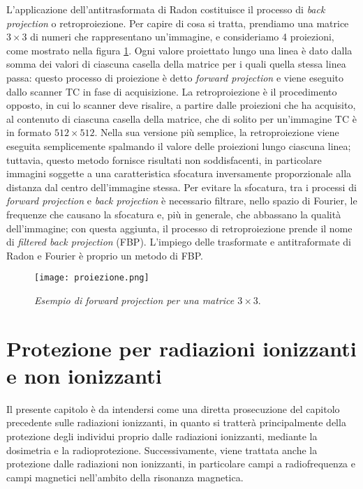 \documentclass{report}
\newcommand{\figref}[1]{figura \ref{#1}}
\numberwithin{equation}{section}
\numberwithin{figure}{section}
\begin{document}
L'applicazione dell'antitrasformata di Radon costituisce il processo di \textit{back projection} o retroproiezione. Per capire di cosa si tratta, prendiamo una matrice $3\times3$ di numeri che rappresentano un'immagine, e consideriamo 4 proiezioni, come mostrato nella \figref{fig:proiezione}. Ogni valore proiettato lungo una linea è dato dalla somma dei valori di ciascuna casella della matrice per i quali quella stessa linea passa: questo processo di proiezione è detto \textit{forward projection} e viene eseguito dallo scanner TC in fase di acquisizione. La retroproiezione è il procedimento opposto, in cui lo scanner deve risalire, a partire dalle proiezioni che ha acquisito, al contenuto di ciascuna casella della matrice, che di solito per un'immagine TC è in formato $512\times512$. Nella sua versione più semplice, la retroproiezione viene eseguita semplicemente spalmando il valore delle proiezioni lungo ciascuna linea; tuttavia, questo metodo fornisce risultati non soddisfacenti, in particolare immagini soggette a una caratteristica sfocatura inversamente proporzionale alla distanza dal centro dell'immagine stessa. Per evitare la sfocatura, tra i processi di \textit{forward projection} e \textit{back projection} è necessario filtrare, nello spazio di Fourier, le frequenze che causano la sfocatura e, più in generale, che abbassano la qualità dell'immagine; con questa aggiunta, il processo di retroproiezione prende il nome di \textit{filtered back projection} (FBP). L'impiego delle trasformate e antitraformate di Radon e Fourier è proprio un metodo di FBP.

\begin{figure}[htp]
\centering
\texttt{[image: proiezione.png]}
\caption{\label{fig:proiezione} \textit{Esempio di forward projection per una matrice $3\times3$}.}
\end{figure}

\chapter{Protezione per radiazioni ionizzanti e non ionizzanti}

Il presente capitolo è da intendersi come una diretta prosecuzione del capitolo precedente sulle radiazioni ionizzanti, in quanto si tratterà principalmente della protezione degli individui proprio dalle radiazioni ionizzanti, mediante la dosimetria e la radioprotezione. Successivamente, viene trattata anche la protezione dalle radiazioni non ionizzanti, in particolare campi a radiofrequenza e campi magnetici nell'ambito della risonanza magnetica.
\end{document}
